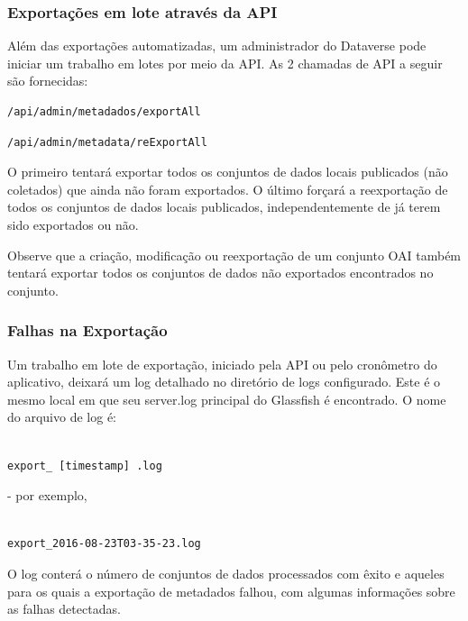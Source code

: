 \documentclass[12pt,hidelinks]{article}
\begin{document}
\subsubsection{Exportações em lote através da API}

\qquad Além das exportações automatizadas, um administrador do Dataverse pode iniciar um trabalho em lotes por meio da API. As 2 chamadas de API a seguir são fornecidas:

\begin{verbatim}
/api/admin/metadados/exportAll
\end{verbatim}

\begin{verbatim}
/api/admin/metadata/reExportAll
\end{verbatim}

O primeiro tentará exportar todos os conjuntos de dados locais publicados (não coletados) que ainda não foram exportados. O último forçará a reexportação de todos os conjuntos de dados locais publicados, independentemente de já terem sido exportados ou não.

Observe que a criação, modificação ou reexportação de um conjunto OAI também tentará exportar todos os conjuntos de dados não exportados encontrados no conjunto.

\subsubsection{Falhas na Exportação}

\qquad Um trabalho em lote de exportação, iniciado pela API ou pelo cronômetro do aplicativo, deixará um log detalhado no diretório de logs configurado. Este é o mesmo local em que seu server.log principal do Glassfish é encontrado. O nome do arquivo de log é:

\begin{verbatim}

export_ [timestamp] .log

\end{verbatim}

- por exemplo,

\begin{verbatim}

export_2016-08-23T03-35-23.log

\end{verbatim}
  
O log conterá o número de conjuntos de dados processados com êxito e aqueles para os quais a exportação de metadados falhou, com algumas informações sobre as falhas detectadas.
\end{document}
